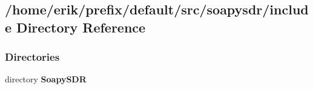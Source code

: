 \subsection{/home/erik/prefix/default/src/soapysdr/include Directory Reference}
\label{dir_76a115339c2baaa85577a749e188ed43}
\subsubsection*{Directories}
\begin{DoxyCompactItemize}
\item 
directory {\bf Soapy\+S\+DR}
\end{DoxyCompactItemize}
